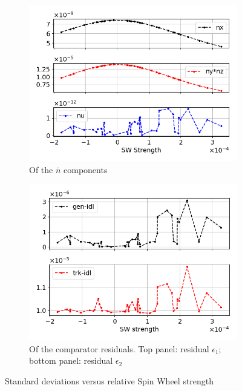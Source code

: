 \documentclass[a4paper]{jacow}
\newcommand{\nbar}{\bar n}
\begin{document}
\begin{figure}[h]
  \centering
  \begin{subfigure}{\linewidth}
    \centering
    \includegraphics[width=\linewidth]{../img/IPAC19/NBAR_variation_sd_vs_SW}
    \caption{Of the $\nbar$ components\label{fig:sd:nbar}}
  \end{subfigure}
  \begin{subfigure}{\linewidth}
    \centering
    \includegraphics[width=\linewidth]{../img/IPAC19/residual_SD_vs_SW(both)}
    \caption{Of the comparator residuals.
      Top panel: residual $\epsilon_1$; bottom panel: residual $\epsilon_2$\label{fig:sd:res}}
  \end{subfigure}
  \caption{Standard deviations versus relative Spin Wheel strength\label{fig:sd}}
\end{figure}
\end{document}
